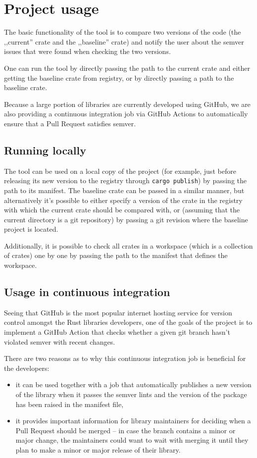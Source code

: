 \documentclass[licencjacka,en]{pracamgr}
\begin{document}
\section{Project usage}

The basic functionality of the tool is to compare two versions of the code (the ,,current'' crate
and the ,,baseline'' crate) and notify the user about the semver issues that were found when
checking the two versions.

One can run the tool by directly passing the path to the current crate and either getting the
baseline crate from registry, or by directly passing a path to the baseline crate.

Because a large portion of libraries are currently developed using GitHub, we are also providing
a continuous integration job via GitHub Actions to automatically ensure that a Pull Request
satisfies semver.

\subsection{Running locally}

The tool can be used on a local copy of the project (for example, just before releasing its new
version to the registry through \texttt{cargo publish}) by passing the path to its manifest.
The baseline crate can be passed in a similar manner, but alternatively it's possible to either
specify a version of the crate in the registry with which the current crate should be compared
with, or (assuming that the current directory is a git repository) by passing a git revision where
the baseline project is located.

Additionally, it is possible to check all crates in a workspace (which is a collection of crates)
one by one by passing the path to the manifest that defines the workspace.

\subsection{Usage in continuous integration}

Seeing that GitHub is the most popular internet hosting service for version control amongst the
Rust libraries developers, one of the goals of the project is to implement a GitHub Action that
checks whether a given git branch hasn't violated semver with recent changes.

There are two reasons as to why this continuous integration job is beneficial for the developers:
\begin{itemize}
	\item it can be used together with a job that automatically publishes a new version of the
		library when it passes the semver lints and the version of the package has been raised
		in the manifest file,
	\item it provides important information for library maintainers for deciding when a Pull
		Request should be merged -- in case the branch contains a minor or major change, the
		maintainers could want to wait with merging it until they plan to make a minor or major
		release of their library.
\end{itemize}
\end{document}
